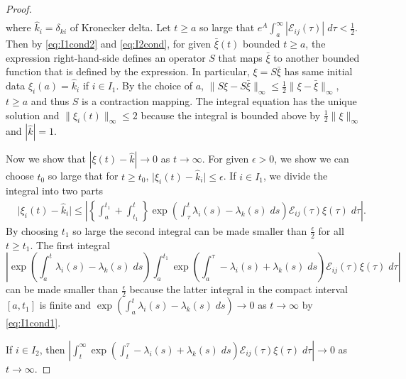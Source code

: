 \documentclass[a4paper,11pt]{article}
\theoremstyle{remark}
\begin{document}
{\begin{proof}
\begin{align*}
\end{align*}
where $\hat{k}_i = \delta_{k i}$ of Kronecker delta. Let $t\ge a$ so large that $e^A\int_a^\infty |\mathcal{E}_{ij}(\tau)|\; d\tau < \frac{1}{2}$. Then by \eqref{eq:I1cond2} and \eqref{eq:I2cond}, for given $\bar\xi(t)$ bounded $t\ge a$, the expression right-hand-side defines an operator $S$ that maps $\bar\xi$ to another bounded function that is defined by the expression. In particular, $\xi=S\bar\xi$ has same initial data $\xi_i(a) = \hat{k}_i$ if $i\in I_1$.
By the choice of $a$, $\|S\xi - S\bar\xi\|_\infty \le \frac{1}{2}\|\xi-\bar\xi\|_\infty$, $t\ge a$ and thus $S$ is a contraction mapping. The integral equation has the unique solution and $\|\xi_i(t)\|_\infty \le 2$ because the integral is bounded above by $ \frac{1}{2} \|\xi\|_\infty$ and $|\hat{k}|=1$.

Now we show that $|\xi(t)-\hat{k}| \rightarrow 0$ as $t \rightarrow \infty$. For given $\epsilon>0$, we show we can choose $t_0$ so large that for $t\ge t_0$, $\big|\xi_i(t)-\hat{k}_i\big| \le \epsilon$. If $i\in I_1$, we divide the integral into two parts
\begin{align*}
 &\big|\xi_i(t)-\hat{k}_i\big| \le \left|\left\{ \int_a^{t_1} + \int_{t_1}^t \right\} \exp\left(\int_\tau^t \lambda_i(s)-\lambda_k(s) \; ds\right)\mathcal{E}_{ij}(\tau)\xi(\tau) \; d\tau \right|.
\end{align*}
By choosing $t_1$ so large the second integral can be made smaller than $ \frac{\epsilon}{2}$ for all $t\ge t_1$. The first integral $$\left|\exp\left(\int_a^t \lambda_i(s)-\lambda_k(s) \; ds\right)\int_a^{t_1} \exp\left(\int_a^\tau -\lambda_i(s)+\lambda_k(s) \; ds\right)\mathcal{E}_{ij}(\tau)\xi(\tau) \; d\tau \right|$$
can be made smaller than $ \frac{\epsilon}{2}$ because the latter integral in the compact interval $[a, t_1]$ is finite and $\exp\left(\int_a^t \lambda_i(s)-\lambda_k(s) \; ds\right) \rightarrow 0$ as $t \rightarrow \infty$ by \eqref{eq:I1cond1}.

If $i\in I_2$, then $\left|\int_t^\infty \exp\left(\int_t^\tau -\lambda_i(s)+\lambda_k(s) \; ds\right)\mathcal{E}_{ij}(\tau)\xi(\tau) \; d\tau\right| \rightarrow 0$ as $t \rightarrow \infty$.
\end{proof}

}
\end{document}
